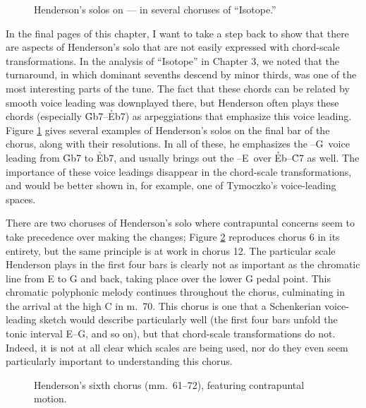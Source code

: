 \begin{figure}[tbp]
  \caption[Henderson's solos on
    \protect\h{Gb7}--\protect\h{Eb7}--\protect\h{C7} in several choruses of
    ``Isotope.'']{Henderson's solos on
    \protect{}--\protect{}--\protect{} in several
    choruses of ``Isotope.''}
  \label{csa:henderson-turnarounds}
\end{figure}

In the final pages of this chapter, I want to take a step back to show that
there are aspects of Henderson's solo that are not easily expressed with
chord-scale transformations. In the analysis of ``Isotope'' in Chapter 3, we
noted that the turnaround, in which dominant sevenths descend by minor thirds,
was one of the most interesting parts of the tune. The fact that these chords
can be related by smooth voice leading was downplayed there, but Henderson
often plays these chords (especially \h{Gb7}--\h{Eb7}) as arpeggiations that
emphasize this voice leading. Figure \ref{csa:henderson-turnarounds} gives
several examples of Henderson's solos on the final bar of the chorus, along
with their resolutions. In all of these, he emphasizes the \Gflat--G\nat\ voice
leading from \h{Gb7} to \h{Eb7}, and usually brings out the \Eflat--E\nat\ over
\h{Eb}--\h{C7} as well. The importance of these voice leadings disappear in
the chord-scale transformations, and would be better shown in, for example, one of
Tymoczko's voice-leading spaces.

There are two choruses of Henderson's solo where contrapuntal concerns seem to
take precedence over making the changes; Figure \ref{csa:contrapuntal-chorus}
reproduces chorus 6 in its entirety, but the same principle is at work in
chorus 12. The particular scale Henderson plays in the first four bars is
clearly not as important as the chromatic line from E to G and back, taking
place over the lower G pedal point. This chromatic polyphonic
melody continues throughout the chorus, culminating in the arrival at the high
C in m.~70. This chorus is one that a Schenkerian voice-leading sketch would
describe particularly well (the first four bars unfold the tonic interval
E--G, and so on), but that chord-scale transformations do not.
Indeed, it is not at all clear which scales are being used, nor do they even
seem particularly important to understanding this chorus.

\begin{figure}[tbp]
  \caption[Henderson's sixth chorus, featuring contrapuntal motion.]{%
    Henderson's sixth chorus (mm.~61--72), featuring contrapuntal motion.}
  \label{csa:contrapuntal-chorus}
\end{figure}

